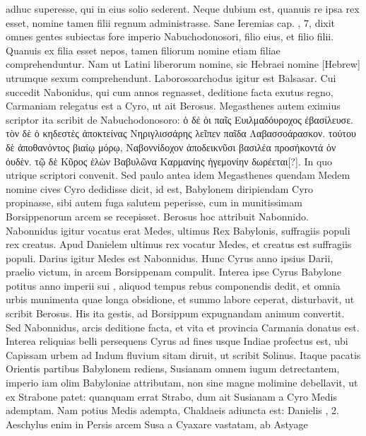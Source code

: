 adhuc superesse, qui in eius solio sederent.
Neque dubium est, quanuis re ipsa rex esset, nomine tamen filii regnum
administrasse.
Sane Ieremias cap. , 7, dixit omnes gentes subiectas
fore imperio Nabuchodonosori, filio eius, et filio filii.
Quanuis ex filia esset nepos, tamen filiorum nomine etiam filiae
 comprehenduntur.
Nam ut Latini liberorum nomine, sic Hebraei nomine
\texthebrew{}[Hebrew] utrumque sexum comprehendunt.
Laborosoarchodus igitur
est Balsasar.
Cui succedit Nabonidus, qui cum annos  regnasset,
deditione facta exutus regno, Carmaniam relegatus est a Cyro,
ut ait Berosus.
Megasthenes autem eximius scriptor ita scribit de
Nabuchodonosoro: \textgreek{ὁ δέ ὁι παῖς Ευιλμαδόυροχος ἐβασίλευσε. τὸν δὲ ὁ
κηδεστὲς ἀποκτείνας Νηριγλισσάρης λεῖπεν παῖδα Λαβασσοάρασκον. τούτου δὲ
ἀποθανόντος βιαίῳ μόρῳ, Ναβοννίδοχον ἀποδεικνῦσι βασιλέα προσήκοντά
ὁν ὀυδὲν. τῷ δὲ Κῦρος ἑλὼν Βαβυλῶνα Καρμανίης ἡγεμονίην δωρέεται[?]}.
In
quo utrique scriptori convenit.
Sed paulo antea idem Megasthenes
quendam Medem nomine cives Cyro dedidisse dicit, id est, Babylonem
diripiendam Cyro propinasse, sibi autem fuga salutem peperisse,
cum in munitissimam Borsippenorum arcem se recepisset.
Berosus hoc attribuit Nabonnido.
Nabonnidus igitur vocatus erat
Medes, ultimus Rex Babylonis, suffragiis populi rex creatus.
Apud
Danielem ultimus rex vocatur Medes, et creatus est suffragiis populi.
Darius igitur Medes est Nabonnidus.
Hunc Cyrus anno 
ipsius Darii, praelio victum, in arcem Borsippenam compulit.
Interea ipse Cyrus Babylone potitus anno imperii sui
 , aliquod
tempus rebus componendis dedit, et omnia urbis munimenta
quae longa obsidione, et summo labore ceperat, disturbavit, ut
scribit Berosus.
His ita gestis, ad Borsippum expugnandam animum
convertit.
Sed Nabonnidus, arcis deditione facta, et vita
et provincia Carmania donatus est.
Interea reliquias belli persequens
Cyrus ad fines usque Indiae profectus est, ubi Capissam urbem
ad Indum fluvium sitam diruit, ut scribit Solinus.
%
Itaque pacatis Orientis partibus Babylonem rediens,
 Susianam omnem iugum
detrectantem, imperio iam olim Babyloniae attributam, non
sine magne molimine debellavit, ut ex Strabone patet: quanquam
errat Strabo, dum ait Susianam a Cyro Medis ademptam.
Nam
potius Medis adempta, Chaldaeis adiuncta est: Danielis , 2.
Aeschylus enim in Persis arcem Susa a Cyaxare vastatam, ab Astyage
